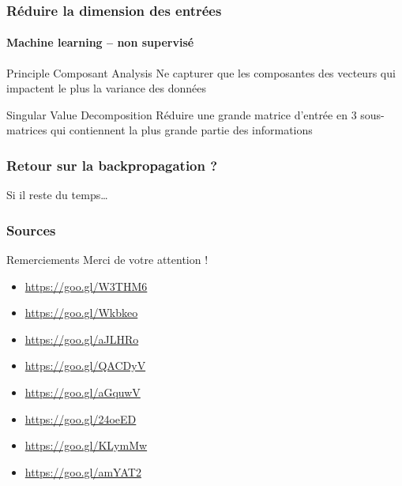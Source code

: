 \documentclass[]{beamer}
\begin{document}
\begin{frame}
  \frametitle{Réduire la dimension des entrées}
  \framesubtitle{Machine learning -- non supervisé}

  \begin{block}{Principle Composant Analysis}
    Ne capturer que les composantes des vecteurs qui impactent le plus la variance des données
  \end{block}

  \begin{exampleblock}{Singular Value Decomposition}
    Réduire une grande matrice d'entrée en 3 sous-matrices qui contiennent la plus grande partie des informations
  \end{exampleblock}

\end{frame}

\begin{frame}
  \frametitle{Retour sur la backpropagation ?}
  \vfill
  \alert{Si il reste du temps\ldots{}}
  \vfill
\end{frame}

\begin{frame}
  \frametitle{Sources}

  \begin{block}{Remerciements}
    Merci de votre attention !
  \end{block}

  \begin{itemize}
    \item \url{https://goo.gl/W3THM6}
    \item \url{https://goo.gl/Wkbkeo}
    \item \url{https://goo.gl/aJLHRo}
    \item \url{https://goo.gl/QACDyV}
    \item \url{https://goo.gl/aGquwV}
    \item \url{https://goo.gl/24oeED}
    \item \url{https://goo.gl/KLymMw}
    \item \url{https://goo.gl/amYAT2}
  \end{itemize}
\end{frame}
\end{document}
